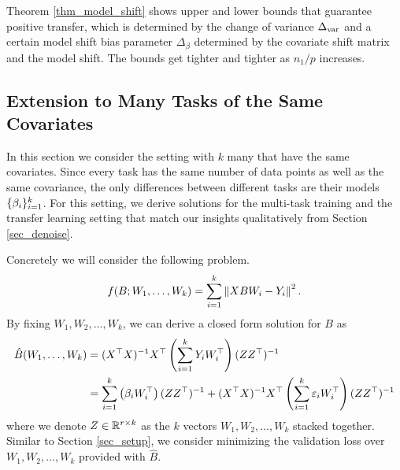 Theorem \ref{thm_model_shift} shows upper and lower bounds that guarantee positive transfer, which is determined by the change of variance $\Delta_{\text{var}}$ and a certain model shift bias parameter $\Delta_{\beta}$ determined by the covariate shift matrix and the model shift.
The bounds get tighter and tighter as $n_1 / p$ increases.


\subsection{Extension to Many Tasks of the Same Covariates}

In this section we consider the setting with $k$ many that have the same covariates.
Since every task has the same number of data points as well as the same covariance, the only differences between different tasks are their models $\{\beta_i\}_{i=1}^k$.
For this setting, we derive solutions for the multi-task training and the transfer learning setting that match our insights qualitatively from Section \ref{sec_denoise}.

Concretely we will consider the following problem.
\begin{align}
	f(B; W_1, \dots, W_k) = \sum_{i=1}^k \left\| X B W_i - Y_i \right\|^2. \label{eq_mtl_same_cov}
\end{align}
By fixing $W_1, W_2, \dots, W_k$, we can derive a closed form solution for $B$ as
\begin{align*}
	\hat{B}(W_1, \dots, W_k) &= (X^{\top}X)^{-1} X^{\top} \left({\sum_{i=1}^k Y_i W_i^{\top}}\right) (Z Z^{\top})^{-1} \\
	&= \sum_{i=1}^k \left({\beta_i W_i^{\top}}\right) (ZZ^{\top})^{-1} + (X^{\top}X)^{-1}X^{\top} \left({\sum_{i=1}^k \varepsilon_i W_i^{\top}}\right) (ZZ^{\top})^{-1}
\end{align*}
where we denote $Z\in\mathbb{R}^{r\times k}$ as the $k$ vectors $W_1, W_2, \dots, W_k$ stacked together.
Similar to Section \ref{sec_setup}, we consider minimizing the validation loss over $W_1, W_2, \dots, W_k$ provided with $\hat{B}$.

